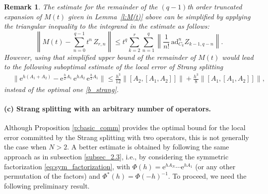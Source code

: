 \documentclass[11pt]{article}
\newcommand{\e}{\ensuremath{\mathrm{e}}}
\newcommand{\ad}{\ensuremath{\mathrm{ad}}}
\newtheorem{remark}[lemma]{Remark}
\begin{document}
\begin{remark} \label{r:l:M(t)}
The estimate for the remainder of the $(q-1)$th order truncated expansion of $M(t)$ given in Lemma~\ref{l:M(t)} above can be simplified by applying the triangular inequality to the integrand in the estimate as follows:
\begin{equation*}
\left\| M(t) - \sum_{n=0}^{q-1} t^n \, Z_{r,n}  \right\| \leq 
t^q \sum_{k=2}^r \sum_{n=1}^{q} 
 \left\| \frac{1}{n!} \,
  \ad_{C_k}^n Z_{k-1,q-n} 
\right\|.
\end{equation*}
However, using that simplified upper bound of the remainder of $M(t)$ would lead to the following suboptimal estimate of the local error of Strang splitting 
\begin{equation} \label{b_strang_so}
\begin{aligned}
 & \|\e^{h (A_1 + A_2)} - \e^{\frac{h}{2} A_1} \, \e^{h A_2} \, \e^{\frac{h}{2} A_1}\|  \leq \frac{h^3}{12} \|[A_2,[A_1,A_2]]\| + \frac{h^3}{8} \|[A_1,[A_1,A_2]]\|,
\end{aligned} 
\end{equation}  
instead of the optimal one \eqref{b_strang}.
\end{remark}


\paragraph{(c) Strang splitting with an arbitrary number of operators.}
Although Proposition \ref{p:basic_comm} provides the optimal bound for the local error committed by the Strang splitting with two operators, this is not generally the
case when $N>2$. A better estimate is obtained by following the same approach as in subsection \ref{subsec_2.3}, i.e., by considering the symmetric
factorization \eqref{eq:sym_factorization},
with $\Phi(h)=\e^{h A_N} \cdots \e^{h A_1}$ (or any other permutation of the factors) and $\Phi^*(h)=\Phi(-h)^{-1}$. To proceed, we need the following
preliminary result.
\end{document}
